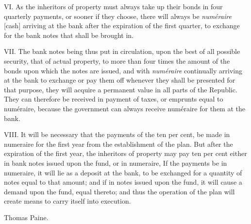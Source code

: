 VI. As the inheritors of property must always take up their bonds in four quarterly payments, or sooner if they choose, there will always be \textit{numéraire} [cash] arriving at the bank after the expiration of the first quarter, to exchange for the bank notes that shall be brought in.\par

VII. The bank notes being thus put in circulation, upon the best of all possible security, that of actual property, to more than four times the amount of the bonds upon which the notes are issued, and with \textit{numéraire} continually arriving at the bank to exchange or pay them off whenever they shall be presented for that purpose, they will acquire a permanent value in all parts of the Republic. They can therefore be received in payment of taxes, or emprunts equal to numéraire, because the government can always receive numéraire for them at the bank.\par

VIII. It will be necessary that the payments of the ten per cent, be made in numeraire for the first year from the establishment of the plan. But after the expiration of the first year, the inheritors of property may pay ten per cent either in bank notes issued upon the fund, or in numeraire, If the payments be in numeraire, it will lie as a deposit at the bank, to be exchanged for a quantity of notes equal to that amount; and if in notes issued upon the fund, it will cause a demand upon the fund, equal thereto; and thus the operation of the plan will create means to carry itself into execution.\par

Thomas Paine.\par

\endgroup
